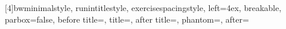 
\usepackage{textcomp}


\usepackage[utf8]{inputenc}
\usepackage[T1]{fontenc}
\usepackage{newpxtext}
\usepackage[vvarbb,cmintegrals,cmbraces,bigdelims]{newpxmath}
\usepackage[scr=rsfso]{mathalfa} %

% 
% 
% 
[4]{bwminimalstyle, runintitlestyle, exercisespacingstyle, left=4ex, breakable, parbox=false, before title={\hspace{-4ex}}, title={}, after title={}, phantom={\hypertarget{#4}{}},  after={}}

